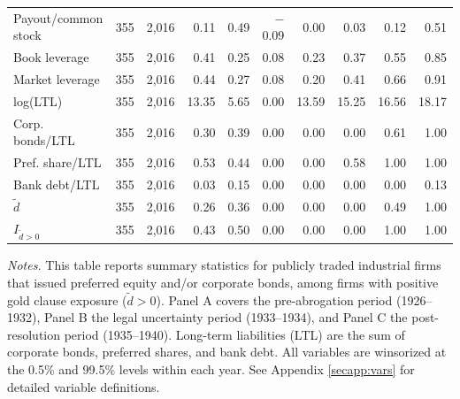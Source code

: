 \begin{table}[p]
\begin{threeparttable}
\begin{tabular}{lrrrrrrrrr}
            Payout/common stock & 355 & 2,016 & 0.11 & 0.49 & $-$0.09 & 0.00 & 0.03 & 0.12 & 0.51 \\
            Book leverage & 355 & 2,016 & 0.41 & 0.25 & 0.08 & 0.23 & 0.37 & 0.55 & 0.85 \\
            Market leverage & 355 & 2,016 & 0.44 & 0.27 & 0.08 & 0.20 & 0.41 & 0.66 & 0.91 \\
            log(LTL) & 355 & 2,016 & 13.35 & 5.65 & 0.00 & 13.59 & 15.25 & 16.56 & 18.17 \\
            Corp. bonds/LTL & 355 & 2,016 & 0.30 & 0.39 & 0.00 & 0.00 & 0.00 & 0.61 & 1.00 \\
            Pref. share/LTL & 355 & 2,016 & 0.53 & 0.44 & 0.00 & 0.00 & 0.58 & 1.00 & 1.00 \\
            Bank debt/LTL & 355 & 2,016 & 0.03 & 0.15 & 0.00 & 0.00 & 0.00 & 0.00 & 0.13 \\
            \ensuremath{\tilde{d}} & 355 & 2,016 & 0.26 & 0.36 & 0.00 & 0.00 & 0.00 & 0.49 & 1.00 \\
            \ensuremath{I_{\tilde{d}>0}} & 355 & 2,016 & 0.43 & 0.50 & 0.00 & 0.00 & 0.00 & 1.00 & 1.00 \\
            \bottomrule
        \end{tabular}
    \end{threeparttable}

    \vspace*{3mm} \justifying \noindent
\scriptsize{\textit{Notes.} This table reports summary statistics for publicly traded industrial firms that issued preferred equity and/or corporate bonds, among firms with positive gold clause exposure ($\tilde{d} > 0$). Panel A covers the pre-abrogation period (1926--1932), Panel B the legal uncertainty period (1933--1934), and Panel C the post-resolution period (1935--1940). Long-term liabilities (LTL) are the sum of corporate bonds, preferred shares, and bank debt. All variables are winsorized at the 0.5\% and 99.5\% levels within each year. See Appendix \ref{secapp:vars} for detailed variable definitions.}
\end{table}